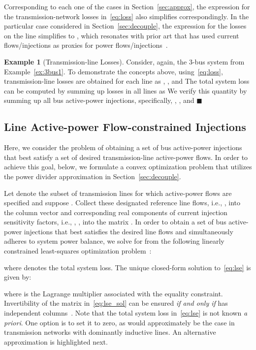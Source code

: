 \documentclass[journal]{IEEEtran}
\theoremstyle{definition}
\newtheorem{example}{Example}
\newcommand{\qedblack}{\hfill \ensuremath{\blacksquare}}
\begin{document}
Corresponding to each one of the cases in Section~\ref{sec:approx}, the expression for the transmission-network losses in~\eqref{eq:loss} also simplifies correspondingly. In the particular case considered in Section~\ref{sec:decouple}, the expression for the losses on the  line simplifies to , which resonates with prior art that has used current flows/injections as proxies for power flows/injections~\cite{Conejo-2007}.

\begin{example}[Transmission-line Losses]
\label{ex:3bus3}
Consider, again, the 3-bus system from Example~\ref{ex:3bus1}.  To demonstrate the concepts above, using~\eqref{eq:loss}, transmission-line losses are obtained for each line as , , and   The total system loss can be computed by summing up losses in all lines as   We verify this quantity by summing up all bus active-power injections, specifically, , , and   \qedblack
\end{example}

\subsection{Line Active-power Flow-constrained Injections} 
Here, we consider the problem of obtaining a set of bus active-power injections that best satisfy a set of desired transmission-line active-power flows. In order to achieve this goal, below, we formulate a convex optimization problem that utilizes the power divider approximation in Section~\ref{sec:decouple}.

Let  denote the subset of  transmission lines for which active-power flows are specified and suppose . Collect these  designated reference line flows, i.e., ,   into the column vector  and corresponding real components of current injection sensitivity factors, i.e., ,  , into the matrix .  In order to obtain a set of bus active-power injections that best satisfies the desired line flows and simultaneously adheres to system power balance, we solve for  from the following linearly constrained least-squares optimization problem~\cite{Boyd:2004}: 

where  denotes the total system loss. The unique closed-form solution to~\eqref{eq:lse} is given by:

where  is the Lagrange multiplier associated with the equality constraint. Invertibility of the matrix in~\eqref{eq:lse_sol} can be ensured \emph{if and only if}  has independent columns~\cite{Vandenberghe:2015}. Note that the total system loss  in~\eqref{eq:lse} is not known \textit{a priori}. One option is to set it to zero, as would approximately be the case in transmission networks with dominantly inductive lines. An alternative approximation is highlighted next. 
\end{document}
